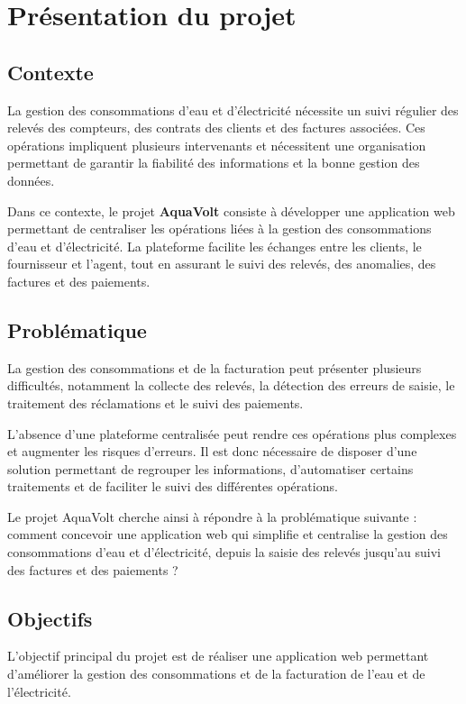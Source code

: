 
\chapter{Présentation du projet}
\label{chap:presentation}

\section{Contexte}

La gestion des consommations d'eau et d'électricité nécessite un suivi régulier des relevés des compteurs, des contrats des clients et des factures associées. Ces opérations impliquent plusieurs intervenants et nécessitent une organisation permettant de garantir la fiabilité des informations et la bonne gestion des données.

Dans ce contexte, le projet \textbf{AquaVolt} consiste à développer une application web permettant de centraliser les opérations liées à la gestion des consommations d'eau et d'électricité. La plateforme facilite les échanges entre les clients, le fournisseur et l'agent, tout en assurant le suivi des relevés, des anomalies, des factures et des paiements.

\section{Problématique}

La gestion des consommations et de la facturation peut présenter plusieurs difficultés, notamment la collecte des relevés, la détection des erreurs de saisie, le traitement des réclamations et le suivi des paiements.

L'absence d'une plateforme centralisée peut rendre ces opérations plus complexes et augmenter les risques d'erreurs. Il est donc nécessaire de disposer d'une solution permettant de regrouper les informations, d'automatiser certains traitements et de faciliter le suivi des différentes opérations.

Le projet AquaVolt cherche ainsi à répondre à la problématique suivante : comment concevoir une application web qui simplifie et centralise la gestion des consommations d'eau et d'électricité, depuis la saisie des relevés jusqu'au suivi des factures et des paiements ?

\section{Objectifs}

L'objectif principal du projet est de réaliser une application web permettant d'améliorer la gestion des consommations et de la facturation de l'eau et de l'électricité.

